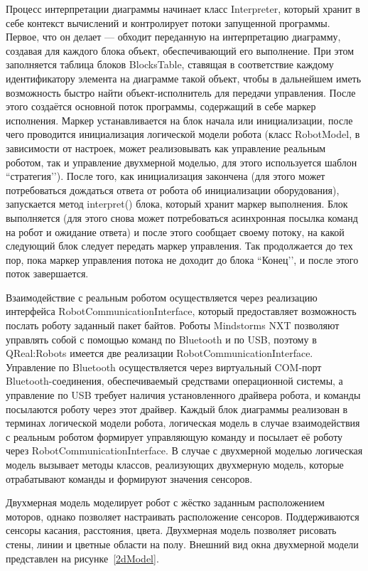 \documentclass[a4paper]{article}
\begin{document}
{Процесс интерпретации диаграммы начинает класс Interpreter, который хранит в себе контекст вычислений и контролирует потоки запущенной программы. Первое, что он делает --- обходит переданную на интерпретацию диаграмму, создавая для каждого блока объект, обеспечивающий его выполнение. При этом заполняется таблица блоков BlocksTable, ставящая в соответствие каждому идентификатору элемента на диаграмме такой объект, чтобы в дальнейшем иметь возможность быстро найти объект-исполнитель для передачи управления. После этого создаётся основной поток программы, содержащий в себе маркер исполнения. Маркер устанавливается на блок начала или инициализации, после чего проводится инициализация логической модели робота (класс RobotModel, в зависимости от настроек, может реализовывать как управление реальным роботом, так и управление двухмерной моделью, для этого используется шаблон ``стратегия’’). После того, как инициализация закончена (для этого может потребоваться дождаться ответа от робота об инициализации оборудования), запускается метод interpret() блока, который хранит маркер выполнения. Блок выполняется (для этого снова может потребоваться асинхронная посылка команд на робот и ожидание ответа) и после этого сообщает своему потоку, на какой следующий блок следует передать маркер управления. Так продолжается до тех пор, пока маркер управления потока не доходит до блока ``Конец’’, и после этого поток завершается.

Взаимодействие с реальным роботом осуществляется через реализацию интерфейса RobotCommunicationInterface, который предоставляет возможность послать роботу заданный пакет байтов. Роботы Mindstorms NXT позволяют управлять собой с помощью команд по Bluetooth и по USB, поэтому в QReal:Robots имеется две реализации RobotCommunicationInterface. Управление по Bluetooth осуществляется через виртуальный COM-порт Bluetooth-соединения, обеспечиваемый средствами операционной системы, а управление по USB требует наличия установленного драйвера робота, и команды посылаются роботу через этот драйвер. Каждый блок диаграммы реализован в терминах логической модели робота, логическая модель в случае взаимодействия с реальным роботом формирует управляющую команду и посылает её роботу через RobotCommunicationInterface. В случае с двухмерной моделью логическая модель вызывает методы классов, реализующих двухмерную модель, которые отрабатывают команды и формируют значения сенсоров.

Двухмерная модель моделирует робот с жёстко заданным расположением моторов, однако позволяет настраивать расположение сенсоров. Поддерживаются сенсоры касания, расстояния, цвета. Двухмерная модель позволяет рисовать стены, линии и цветные области на полу. Внешний вид окна двухмерной модели представлен на рисунке~\ref{2dModel}.

}
\end{document}
